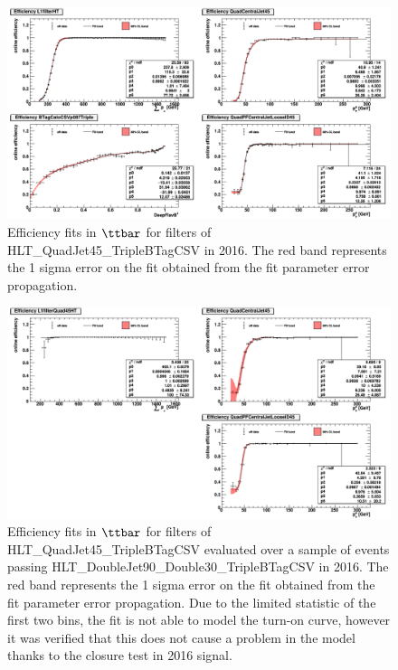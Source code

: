 \begin{figure}[htbp!]
\begin{center}
    \includegraphics[width=0.8\linewidth]{Figures/AnalysisStrategy/triggerfits/TriggerEfficiencies_2016_TTBarCut_TTbar_Quad45_Fit_fullRange.png}
\end{center}
\caption[Efficiency fits in $\ttbar$ for filters of HLT\_QuadJet45\_TripleBTagCSV in 2016]{Efficiency fits in $\ttbar$ for filters of HLT\_QuadJet45\_TripleBTagCSV in 2016. The red band represents the 1 sigma error on the fit obtained from the fit parameter error propagation.}
\label{trigger:fig:TTbarFilterEfficiency2016QuadFit}
\end{figure}

\begin{figure}[htbp!]
\begin{center}
    \includegraphics[width=0.8\linewidth]{Figures/AnalysisStrategy/triggerfits/TriggerEfficiencies_2016_TTBarCut_TTbar_And_Fit_fullRange.png}
\end{center}
\caption[Efficiency fits in $\ttbar$ for filters in paths overlap in 2016]{Efficiency fits in $\ttbar$ for filters of HLT\_QuadJet45\_TripleBTagCSV evaluated over a sample of events passing HLT\_DoubleJet90\_Double30\_TripleBTagCSV in 2016. The red band represents the 1 sigma error on the fit obtained from the fit parameter error propagation. Due to the limited statistic of the first two bins, the fit is not able to model the turn-on curve, however it was verified that this does not cause a problem in the model thanks to the closure test in 2016 signal.}
\label{trigger:fig:TTbarFilterEfficiency2016AndFit}
\end{figure}

